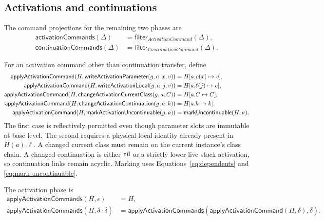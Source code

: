 \subsection{Activations and continuations}

The command projections for the remaining two phases are
\begin{equation}\label{eq:control-command-projections}
\begin{aligned}
 \mathsf{activationCommands}(\Delta)&=
  \mathsf{filter}_{\mathit{ActivationCommand}}(\Delta),\\
 \mathsf{continuationCommands}(\Delta)&=
  \mathsf{filter}_{\mathit{ContinuationCommand}}(\Delta).
\end{aligned}
\end{equation}

For an activation command other than continuation transfer, define
\begin{equation}\label{eq:activation-field-effects}
\begin{aligned}
 \mathsf{applyActivationCommand}(H,\mathsf{writeActivationParameter}(g,a,x,v))
   &=H[a.\rho(x)\mapsto v],\\
 \mathsf{applyActivationCommand}(H,\mathsf{writeActivationLocal}(g,a,j,v))
   &=H[a.\ell(j)\mapsto v],\\
 \mathsf{applyActivationCommand}(H,\mathsf{changeActivationCurrentClass}(g,a,C))
   &=H[a.C\mapsto C],\\
 \mathsf{applyActivationCommand}(H,\mathsf{changeActivationContinuation}(g,a,k))
   &=H[a.k\mapsto k],\\
 \mathsf{applyActivationCommand}(H,\mathsf{markActivationUncontinuable}(g,a))
   &=\mathsf{markUncontinuable}(H,a).
\end{aligned}
\end{equation}
The first case is reflectively permitted even though parameter slots are
immutable at base level.  The second requires a physical local identity
already present in $H(a).\ell$.  A changed current class must remain on the
current instance's class chain.  A changed continuation is either $\mathsf{nil}$ or a
strictly lower live stack activation, so continuation links remain acyclic.
Marking uses Equations~\eqref{eq:dependents} and
\eqref{eq:mark-uncontinuable}.

The activation phase is
\begin{equation}\label{eq:activation-command-fold}
\begin{aligned}
 \mathsf{applyActivationCommands}(H,\epsilon)&=H,\\
 \mathsf{applyActivationCommands}(H,\delta\cdot\bar\delta)
   &=\mathsf{applyActivationCommands}
       (\mathsf{applyActivationCommand}(H,\delta),\bar\delta).
\end{aligned}
\end{equation}

